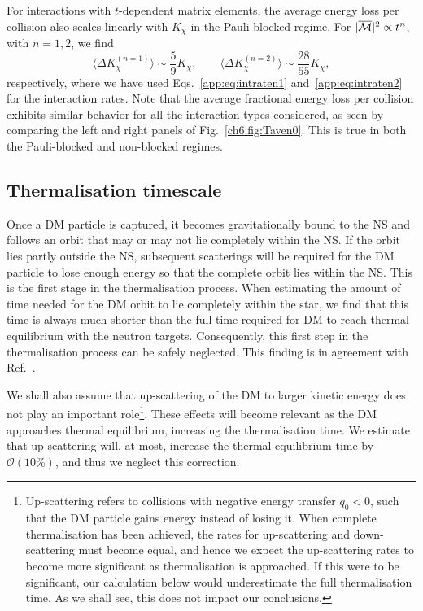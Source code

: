 For interactions with $t$-dependent matrix elements, the average energy loss per collision also scales linearly with $K_\chi$ in the Pauli blocked regime. For $|\overline{\mathcal M}|^2 \propto t^n$, with $n=1,2$, we find 
\begin{equation}
  \langle \Delta K_\chi^{(n=1)}\rangle \sim \frac{5}{9}K_\chi, \qquad 
  \langle \Delta K_\chi^{(n=2)} \rangle \sim \frac{28}{55}K_\chi ,
  \label{ch6:eq:aveElossn12}
\end{equation}
respectively, where we have used Eqs.~\ref{app:eq:intraten1} and~\ref{app:eq:intraten2} for the interaction rates.
Note that the average fractional energy loss  per collision exhibits similar behavior for all the interaction types considered,  
as seen by comparing the left and right panels of Fig.~\ref{ch6:fig:Taven0}. 
This is true in both the Pauli-blocked and non-blocked regimes.





\subsection{Thermalisation timescale}
\label{ch6:sec:thermstandard}




Once a DM particle is captured, it becomes gravitationally bound to the NS and follows an orbit that may or may not lie completely within the NS. If the orbit lies partly outside the NS, subsequent scatterings will be required for the DM particle to lose enough energy so that the complete orbit lies within the NS. This is the first stage in the thermalisation process. When estimating the amount of time needed for the DM orbit to lie completely within the star,  we find that this time is always much shorter than the full time required for DM to reach thermal equilibrium with the neutron targets. Consequently, this first step in the thermalisation process can be safely neglected. This finding is in agreement with Ref.~\cite{Garani:2018kkd_may_NewAnalysisNeutron}. 

We shall also assume that up-scattering of the DM to larger kinetic energy does not play an important role\footnote{Up-scattering refers to collisions with negative energy transfer $q_0<0$, such that the DM particle gains energy instead of losing it. When complete thermalisation has been achieved, the rates for up-scattering and down-scattering must become equal, and hence we expect the up-scattering rates to become more significant as thermalisation is approached.
If this were to be significant, our calculation below would underestimate the full thermalisation time. As we shall see, this does not impact our conclusions.}. These effects will become relevant as the DM approaches thermal equilibrium, increasing the thermalisation time. We estimate that up-scattering will, at most, increase the thermal equilibrium time by $\mathcal{O}(10\%)$, and thus we neglect this correction. 


